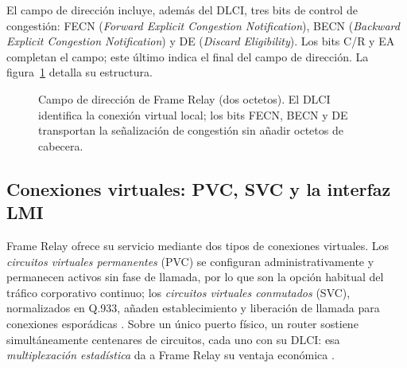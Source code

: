 \documentclass[12pt,a4paper]{article}
\begin{document}
El campo de dirección incluye, además del DLCI, tres bits de control de congestión: FECN (\emph{Forward Explicit Congestion Notification}), BECN (\emph{Backward Explicit Congestion Notification}) y DE (\emph{Discard Eligibility}). Los bits C/R y EA completan el campo; este último indica el final del campo de dirección. La figura~\ref{fig:trama} detalla su estructura.

\begin{figure}[h]
    \centering
    \caption{Campo de dirección de Frame Relay (dos octetos). El DLCI identifica la conexión virtual local; los bits FECN, BECN y DE transportan la señalización de congestión sin añadir octetos de cabecera.}
    \label{fig:trama}
\end{figure}

\subsection{Conexiones virtuales: PVC, SVC y la interfaz LMI}

Frame Relay ofrece su servicio mediante dos tipos de conexiones virtuales. Los \emph{circuitos virtuales permanentes} (PVC) se configuran administrativamente y permanecen activos sin fase de llamada, por lo que son la opción habitual del tráfico corporativo continuo; los \emph{circuitos virtuales conmutados} (SVC), normalizados en Q.933, añaden establecimiento y liberación de llamada para conexiones esporádicas \cite{ituq933, frf10}. Sobre un único puerto físico, un router sostiene simultáneamente centenares de circuitos, cada uno con su DLCI: esa \emph{multiplexación estadística} da a Frame Relay su ventaja económica \cite{buckwalter1999, cisco}.
\end{document}
